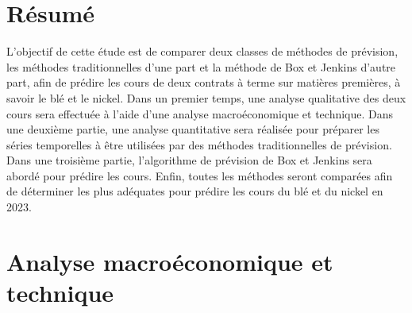 \documentclass[12pt,a4paper]{article}
\begin{document}
\clearpage
{}



{\centering
\vspace*{\fill}
\section*{Résumé}}
L'objectif de cette étude est de comparer deux classes de méthodes de prévision, les méthodes traditionnelles d'une part et la méthode de Box et Jenkins d'autre part, afin de prédire les cours de deux contrats à terme sur matières premières, à savoir le blé et le nickel. Dans un premier temps, une analyse qualitative des deux cours sera effectuée à l'aide d'une analyse macroéconomique et technique. Dans une deuxième partie, une analyse quantitative sera réalisée pour préparer les séries temporelles à être utilisées par des méthodes traditionnelles de prévision. Dans une troisième partie, l'algorithme de prévision de Box et Jenkins sera abordé pour prédire les cours. Enfin, toutes les méthodes seront comparées afin de déterminer les plus adéquates pour prédire les cours du blé et du nickel en 2023.
\vspace*{\fill}
\clearpage


{\centering
\vspace*{\fill}
}
\vspace*{\fill}
\clearpage











\appendix
{}
\renewcommand{\thetable}{\thesection.\arabic{table}}
\renewcommand{\thefigure}{\thesection.\arabic{figure}}
\section{Analyse macroéconomique et technique}
\setcounter{table}{0}
\setcounter{figure}{0}
\end{document}
